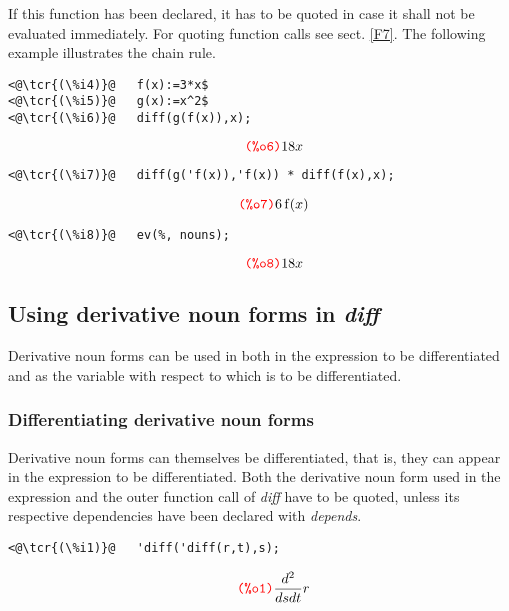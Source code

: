 \documentclass[../Maxima_Workbook.tex]{subfiles}
\begin{document}
If this function has been declared, it has to be quoted in case it shall not be evaluated immediately. For quoting function calls see sect. \ref{F7}. The following example illustrates the chain rule.

\lz \begin{small}
\color{blue} \leqn
\begin{lstlisting}
<@\tcr{(\%i4)}@   f(x):=3*x$
<@\tcr{(\%i5)}@   g(x):=x^2$
<@\tcr{(\%i6)}@   diff(g(f(x)),x);
\end{lstlisting}
\vspace{-5mm} \[\tag*{\tcr{\ttfamily (\%o6)}} 18 x \]
\vspace{-9mm} \begin{lstlisting}
<@\tcr{(\%i7)}@   diff(g('f(x)),'f(x)) * diff(f(x),x);
\end{lstlisting}
\vspace{-5mm} \[\tag*{\tcr{\ttfamily (\%o7)}} 6 \operatorname{f}(x) \]
\vspace{-9mm} \begin{lstlisting}
<@\tcr{(\%i8)}@   ev(%, nouns);
\end{lstlisting}
\vspace{-5mm} \[\tag*{\tcr{\ttfamily (\%o8)}} 18 x \]
\color{black} \reqn
\end{small} \vspace{-7mm}

\subsection{Using derivative noun forms in \emph{diff}}

Derivative noun forms can be used in  both in the expression to be differentiated and as the variable with respect to which is to be differentiated. 

\subsubsection{Differentiating derivative noun forms}

Derivative noun forms can themselves be differentiated, that is, they can appear in the expression to be differentiated. Both the derivative noun form used in the expression and the outer function call of \emph{diff} have to be quoted, unless its respective dependencies have been declared with \emph{depends}.

\lz \begin{small}
\color{blue} \leqn
\begin{lstlisting}
<@\tcr{(\%i1)}@   'diff('diff(r,t),s);
\end{lstlisting}
\vspace{-5mm} \[\tag*{\tcr{\ttfamily (\%o1)}} \frac{{{d}^{2}}}{d s d t} r \]
\color{black} \reqn
\end{small} \vspace{-6mm}
\end{document}
